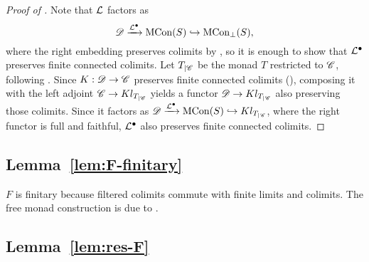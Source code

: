 \begin{proof}
[Proof of ] Note that ${\cal L}$ factors
as 
\[
\D\xrightarrow{{\cal L}^{\bullet}}\Th S\hookrightarrow\Thbot S,
\]
where the right embedding preserves colimits by ,
so it is enough to show that ${\cal L}^{\bullet}$ preserves finite
connected colimits. Let $T_{|\C}$ be the monad $T$ restricted to
$\C$, following . Since $K:\D\rightarrow\C$ preserves
finite connected colimits (), composing
it with the left adjoint $\C\rightarrow\Kl{T_{|\C}}$ yields a functor
$\D\rightarrow\Kl{T_{|\C}}$ also preserving those colimits. Since
it factors as $\D\xrightarrow{{\cal L}^{\bullet}}\Th S\hookrightarrow\Kl{T_{|\C}}$,
where the right functor is full and faithful, ${\cal L}^{\bullet}$
also preserves finite connected colimits.
\end{proof}

\subsection{Lemma~\ref{lem:F-finitary}}

\label{app:F-finitary}$F$ is finitary because filtered colimits
commute with finite limits \citet[Theorem IX.2.1]{MacLane:cwm} and
colimits. The free monad construction is due to \citet{Reiterman}.

\subsection{Lemma~\ref{lem:res-F}}

